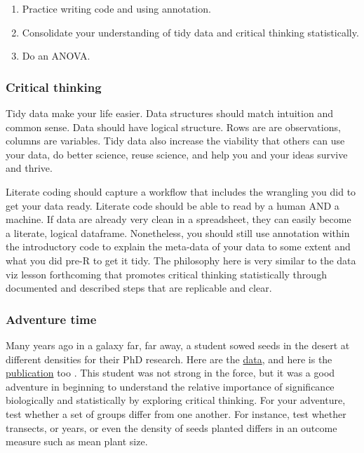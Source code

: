 \documentclass[
]{book}
\providecommand{\tightlist}{%
  \setlength{\itemsep}{0pt}\setlength{\parskip}{0pt}}
\begin{document}
\begin{enumerate}
\def\labelenumi{\arabic{enumi}.}
\tightlist
\item
  Practice writing code and using annotation.\\
\item
  Consolidate your understanding of tidy data and critical thinking statistically.\\
\item
  Do an ANOVA.
\end{enumerate}

\hypertarget{critical-thinking-1}{%
\subsubsection*{Critical thinking}\label{critical-thinking-1}}

Tidy data make your life easier. Data structures should match intuition and common sense. Data should have logical structure. Rows are are observations, columns are variables. Tidy data also increase the viability that others can use your data, do better science, reuse science, and help you and your ideas survive and thrive.

Literate coding \citep{RN4414} should capture a workflow that includes the wrangling you did to get your data ready. Literate code should be able to read by a human AND a machine. If data are already very clean in a spreadsheet, they can easily become a literate, logical dataframe. Nonetheless, you should still use annotation within the introductory code to explain the meta-data of your data to some extent and what you did pre-R to get it tidy. The philosophy here is very similar to the data viz lesson forthcoming that promotes critical thinking statistically through documented and described steps that are replicable and clear.

\hypertarget{adventure-time-1}{%
\subsubsection*{Adventure time}\label{adventure-time-1}}

Many years ago in a galaxy far, far away, a student sowed seeds in the desert at different densities for their PhD research. Here are the \href{https://figshare.com/articles/dataset/Density_experiment_in_Negev_Desert_Israel/669703}{data}, and here is the \href{https://besjournals.onlinelibrary.wiley.com/doi/10.1046/j.1365-2745.2002.00686.x}{publication} too \citep{RN3094}. This student was not strong in the force, but it was a good adventure in beginning to understand the relative importance of significance biologically and statistically by exploring critical thinking. For your adventure, test whether a set of groups differ from one another. For instance, test whether transects, or years, or even the density of seeds planted differs in an outcome measure such as mean plant size.
\end{document}
